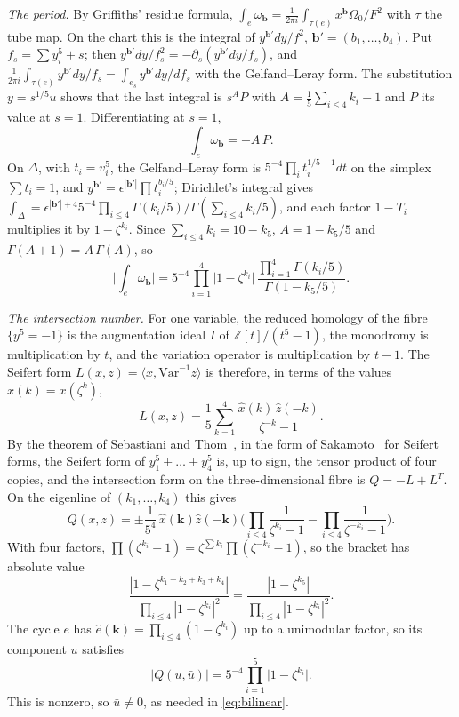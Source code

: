 \documentclass[11pt]{amsart}
\theoremstyle{definition}
\theoremstyle{remark}
\newcommand{\Z}{\mathbb{Z}}
\newcommand{\ip}[2]{\langle #1,#2\rangle}
\newcommand{\bb}{\mathbf{b}}
\begin{document}
\emph{The period.} By Griffiths' residue formula,
$\int_e\omega_{\bb}=\frac1{2\pi i}\int_{\tau(e)}x^{\bb}\Omega_0/F^2$ with
$\tau$ the tube map. On the chart this is the integral of
$y^{\bb'}dy/f^2$, $\bb'=(b_1,\dots,b_4)$. Put $f_s=\sum y_i^5+s$; then
$y^{\bb'}dy/f_s^2=-\partial_s(y^{\bb'}dy/f_s)$, and
$\frac1{2\pi i}\int_{\tau(e)}y^{\bb'}dy/f_s=\int_{e_s}y^{\bb'}dy/df_s$
with the Gelfand--Leray form. The substitution $y=s^{1/5}u$ shows that the
last integral is $s^{A}P$ with $A=\frac15\sum_{i\le4}k_i-1$ and $P$ its value
at $s=1$. Differentiating at $s=1$,
\[
\int_e\omega_{\bb}=-A\,P.
\]
On $\Delta$, with $t_i=v_i^5$, the Gelfand--Leray form is
$5^{-4}\prod_it_i^{1/5-1}dt$ on the simplex $\sum t_i=1$, and
$y^{\bb'}=\epsilon^{|\bb'|}\prod t_i^{b_i/5}$; Dirichlet's integral gives
$\int_\Delta=\epsilon^{|\bb'|+4}5^{-4}\prod_{i\le4}\Gamma(k_i/5)/
\Gamma(\sum_{i\le4}k_i/5)$, and each factor $1-T_i$ multiplies it by
$1-\zeta^{k_i}$. Since $\sum_{i\le4}k_i=10-k_5$, $A=1-k_5/5$ and
$\Gamma(A+1)=A\,\Gamma(A)$, so
\begin{equation}\label{eq:period}
\Big|\int_e\omega_{\bb}\Big|=5^{-4}\prod_{i=1}^4\big|1-\zeta^{k_i}\big|
\,\frac{\prod_{i=1}^4\Gamma(k_i/5)}{\Gamma(1-k_5/5)}.
\end{equation}

\emph{The intersection number.} For one variable, the reduced homology of
the fibre $\{y^5=-1\}$ is the augmentation ideal $I$ of $\Z[t]/(t^5-1)$,
the monodromy is multiplication by $t$, and the variation operator is
multiplication by $t-1$. The Seifert form $L(x,z)=\ip{x}{\mathrm{Var}^{-1}z}$
is therefore, in terms of the values $\hat x(k)=x(\zeta^k)$,
\[
L(x,z)=\frac15\sum_{k=1}^4\frac{\hat x(k)\,\hat z(-k)}{\zeta^{-k}-1}.
\]
By the theorem of Sebastiani and Thom~\cite{ST71}, in the form of
Sakamoto~\cite{Sak74} for Seifert forms, the Seifert form of
$y_1^5+\dots+y_4^5$ is, up to sign, the tensor product of four copies, and
the intersection form on the three-dimensional fibre is $Q=-L+L^{T}$. On the
eigenline of $(k_1,\dots,k_4)$ this gives
\[
Q(x,z)=\pm\frac1{5^4}\,\hat x(\mathbf k)\hat z(-\mathbf k)\Big(
\prod_{i\le4}\frac1{\zeta^{k_i}-1}-\prod_{i\le4}\frac1{\zeta^{-k_i}-1}\Big).
\]
With four factors, $\prod(\zeta^{k_i}-1)=\zeta^{\sum k_i}\prod(\zeta^{-k_i}
-1)$, so the bracket has absolute value
\[
\frac{|1-\zeta^{k_1+k_2+k_3+k_4}|}{\prod_{i\le4}|1-\zeta^{k_i}|^2}
=\frac{|1-\zeta^{k_5}|}{\prod_{i\le4}|1-\zeta^{k_i}|^2}.
\] The cycle $e$ has
$\hat e(\mathbf k)=\prod_{i\le4}(1-\zeta^{k_i})$ up to a unimodular factor,
so its component $u$ satisfies
\begin{equation}\label{eq:intersection}
|Q(u,\bar u)|=5^{-4}\prod_{i=1}^5\big|1-\zeta^{k_i}\big|.
\end{equation}
This is nonzero, so $\bar u\ne0$, as needed in \eqref{eq:bilinear}.
\end{document}

